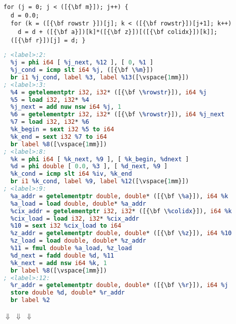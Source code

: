 \centering
\vspace{1.9mm}
\begin{lstlisting}[language=MyCpp]
for (j = 0; j < ([{\bf m}]); j++) {
  d = 0.0;
  for (k = ([{\bf rowstr }])[j]; k < ([{\bf rowstr}])[j+1]; k++)
    d = d + ([{\bf a}])[k]*([{\bf z}])[([{\bf colidx}])[k]];
  ([{\bf r}])[j] = d; }
\end{lstlisting}
\vspace{-3.5mm}
\begin{lstlisting}[language={LLVM}, label={fig:spmvexample1}, caption=
   {Sparse matrix-vector product shown in C at the top, and in LLVM IR at the
    bottom\leftskip=0pt\rightskip=0pt}]
; <label>:2:
  %j = phi i64 [ %j_next, %12 ], [ 0, %1 ]
  %j_cond = icmp slt i64 %j, ([{\bf \%m}])
  br i1 %j_cond, label %3, label %13([\vspace{1mm}])
; <label>:3:
  %4 = getelementptr i32, i32* ([{\bf \%rowstr}]), i64 %j
  %5 = load i32, i32* %4
  %j_next = add nuw nsw i64 %j, 1
  %6 = getelementptr i32, i32* ([{\bf \%rowstr}]), i64 %j_next
  %7 = load i32, i32* %6
  %k_begin = sext i32 %5 to i64
  %k_end = sext i32 %7 to i64
  br label %8([\vspace{1mm}])
; <label>:8:
  %k = phi i64 [ %k_next, %9 ], [ %k_begin, %dnext ]
  %d = phi double [ 0.0, %3 ], [ %d_next, %9 ]
  %k_cond = icmp slt i64 %iv, %k_end
  br i1 %k_cond, label %9, label %12([\vspace{1mm}])
; <label>:9:
  %a_addr = getelementptr double, double* ([{\bf \%a}]), i64 %k
  %a_load = load double, double* %a_addr
  %cix_addr = getelementptr i32, i32* ([{\bf \%colidx}]), i64 %k
  %cix_load = load i32, i32* %cix_addr
  %10 = sext i32 %cix_load to i64
  %z_addr = getelementptr double, double* ([{\bf \%z}]), i64 %10
  %z_load = load double, double* %z_addr
  %11 = fmul double %a_load, %z_load
  %d_next = fadd double %d, %11
  %k_next = add nsw i64 %k, 1
  br label %8([\vspace{1mm}])
; <label>:12:
  %r_addr = getelementptr double, double* ([{\bf \%r}]), i64 %j
  store double %d, double* %r_addr
  br label %2
\end{lstlisting}

\vspace{0.05mm}
{{\Huge$\Downarrow$}
\hspace{-2.73mm}\phantom{\bf~~~Idiom Detection with IDL~~}\hspace{-3.69mm}
{\Huge$\Downarrow$}
\hspace{-2.73mm}\hspace{-3.69mm}
{\Huge$\Downarrow$}}
\hspace{5.1mm}

